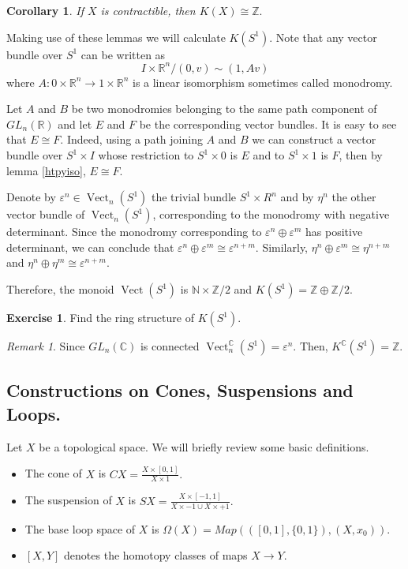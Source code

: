 \documentclass[a4paper,10pt]{article}
\theoremstyle{plain}%
\newtheorem{cor}{Corollary}
\theoremstyle{definition}
\newtheorem{exer}{Exercise}
\theoremstyle{remark}
\newtheorem{rem}{Remark}
\newcommand{\NN}{\mathbb{N}}
\newcommand{\ZZ}{\mathbb{Z}}
\newcommand{\RR}{\mathbb{R}}
\newcommand{\CC}{\mathbb{C}}
\DeclareMathOperator{\Vect}{Vect}
\renewcommand{\epsilon}{\varepsilon}
\begin{document}
\begin{cor}
If $X$ is contractible, then $K(X)\cong \ZZ.$
\end{cor}

Making use of these lemmas we will calculate $K(S^1).$ Note that any vector bundle over $S^1$ can be written as
\[
I \times \RR^n\big/ (0,v) \sim (1,Av)
\]
where $A:0\times \RR^n \to 1\times \RR^n$ is a linear isomorphism sometimes called monodromy.

Let $A$ and $B$ be two monodromies belonging to the same path component of $GL_n(\RR)$ and let $E$ and $F$ be the corresponding vector bundles.  It is easy to see that $E\cong F$. Indeed, using a path joining $A$ and $B$ we can construct a vector bundle over $S^1\times I$ whose restriction to $S^1\times 0$ is $E$ and to $S^1\times 1$ is $F$, then by lemma \ref{htpyiso}, $E\cong F$.

Denote by $\epsilon^n\in \Vect_n(S^1)$ the trivial bundle $S^1\times R^n$ and by $\eta^n$ the other vector bundle of $\Vect_n(S^1)$, corresponding to the monodromy with negative determinant. Since the monodromy corresponding to $\epsilon^n\oplus\epsilon^m$ has positive determinant, we can conclude that $\epsilon^n\oplus\epsilon^m\cong \epsilon^{n+m}.$ Similarly, $\eta^n\oplus\epsilon^m\cong \eta^{n+m}$ and $\eta^n\oplus\eta^m\cong \epsilon^{n+m}.$

Therefore, the monoid $\Vect(S^1)$ is $\NN\times\ZZ/2$ and $K(S^1)=\ZZ\oplus \ZZ / 2.$

\begin{exer}
Find the ring structure of $K(S^1).$
\end{exer}

\begin{rem}
Since $GL_n(\CC)$ is connected $\Vect_n^{\CC}(S^1) = {\epsilon^n}$. Then, $K^\CC (S^1) = \ZZ.$
\end{rem}

\subsection{Constructions on Cones, Suspensions and Loops.}

Let $X$ be a topological space. We will briefly review some basic definitions.

\begin{itemize}
\item The cone of $X$ is $CX=\frac{X\times[0,1]}{X\times 1}.$

\item The suspension of $X$ is $SX = \frac{X \times [-1,1]}{X\times -1\cup X\times +1}.$

\item The base loop space of $X$ is $\Omega (X) =  Map(([0,1],\{0,1\}),(X,x_0)).$

\item $[X,Y]$ denotes the homotopy classes of maps $X\to Y.$
\end{itemize}
\end{document}
